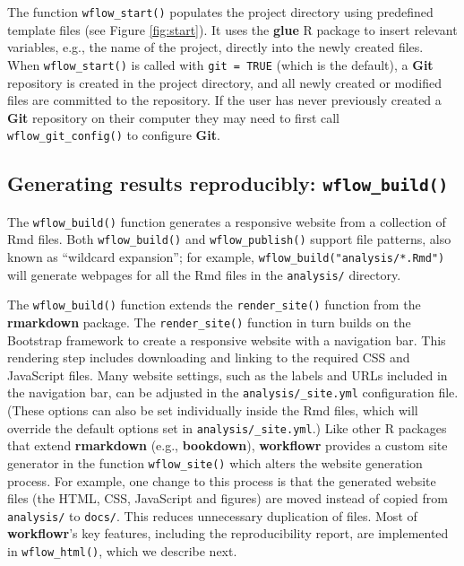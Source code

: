 \documentclass[9pt,a4paper]{extarticle}
\begin{document}
The function \texttt{wflow\_start()} populates the project directory using
predefined template files (see Figure \ref{fig:start}). It uses the \textbf{glue} \cite{glue} R
package to insert relevant variables, e.g., the name of the project,
directly into the newly created files. When \texttt{wflow\_start()} is called with
\texttt{git = TRUE} (which is the default), a \textbf{Git} repository is created
in the project directory, and all newly created or modified files are
committed to the repository. If the user has never previously created a
 \textbf{Git} repository on their computer they may need to first call
\texttt{wflow\_git\_config()} to configure \textbf{Git}.

\subsection*{Generating results reproducibly: \texttt{wflow\_build()}}

The \texttt{wflow\_build()} function generates a responsive website from a
collection of Rmd files. Both \texttt{wflow\_build()} and \texttt{wflow\_publish()} support
file patterns, also known as “wildcard expansion”; for example,
\texttt{wflow\_build("analysis/*.Rmd")} will generate webpages for all
the Rmd files in the \texttt{analysis/} directory.

The \texttt{wflow\_build()} function extends the \texttt{render\_site()} function from the
 \textbf{rmarkdown} package. The \texttt{render\_site()} function in turn builds on the
Bootstrap framework to create a responsive website with a navigation
bar. This rendering step includes downloading and linking to the
required CSS and JavaScript files. Many website settings, such as the
labels and URLs included in the navigation bar, can be adjusted in the
\texttt{analysis/\_site.yml} configuration file. (These options can also
be set individually inside the Rmd files, which will override the
default options set in \texttt{analysis/\_site.yml}.) Like other R
packages that extend \textbf{rmarkdown} (e.g., \textbf{bookdown}), \textbf{workflowr} provides a
custom site generator in the function \texttt{wflow\_site()} which alters the
website generation process. For example, one change to this process is
that the generated website files (the HTML, CSS, JavaScript and figures)
are moved instead of copied from \texttt{analysis/} to \texttt{docs/}. This
reduces unnecessary duplication of files. Most of \textbf{workflowr}’s key
features, including the reproducibility report, are implemented in
\texttt{wflow\_html()}, which we describe next.
\end{document}
